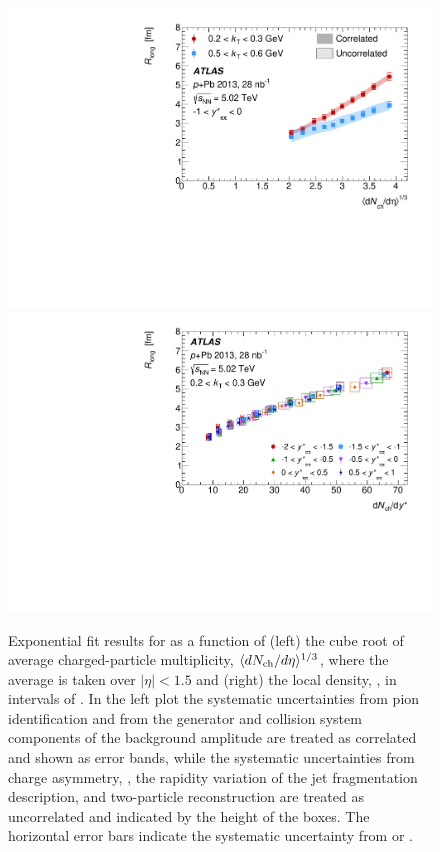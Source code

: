 \begin{figure}[ht]
\centering
\includegraphics[width=0.49\linewidth]{canqosl_Rlong_vs_avg_mult.pdf}
\includegraphics[width=0.49\linewidth]{canqosl_Rlong_kt1_vs_mult.pdf}
\caption{Exponential fit results for \Rlong as a function of (left) the cube root of average charged-particle multiplicity, $\langle d\mbox{$N_{\mathrm{ch}}$}/d\eta\rangle^{1/3}$, where the average is taken over $|\eta| < 1.5$  and (right) the local density, \dNdy, in intervals of \kys. In the left plot the systematic uncertainties from pion identification and from the generator and collision system components of the background amplitude are treated as correlated and shown as error bands, while the systematic uncertainties from charge asymmetry, \Reff, the rapidity variation of the jet fragmentation description, and two-particle reconstruction are treated as uncorrelated and indicated by the height of the boxes. The horizontal error bars indicate the systematic uncertainty from \avgdNdeta or \dNdy.}
\label{fig:results_Rlong_mult}
\end{figure}

\FloatBarrier

